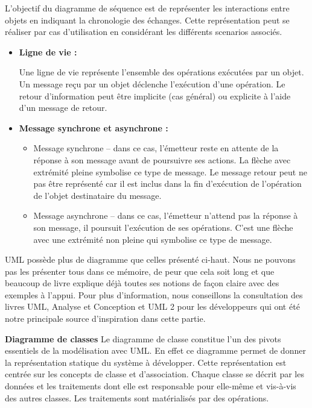 L’objectif du diagramme de séquence est de représenter les interactions entre objets en indiquant la chronologie des échanges. Cette représentation peut se réaliser par cas d’utilisation en considérant les différents scenarios associés. 
		\begin{itemize}[label=\textbullet, font=\LARGE \color{blue}] 
			\item   \textbf{Ligne de vie :} 
		
			Une ligne de vie représente l’ensemble des opérations exécutées par un objet. Un message reçu par un objet déclenche l’exécution d’une opération. Le retour d’information peut être implicite (cas général) ou explicite à l’aide d’un message de retour. 
			\item  \textbf{Message synchrone et asynchrone :} 
					\begin{itemize}[label=\textbullet, font=\LARGE \color{black}] 
						\item  Message synchrone – dans ce cas, l’émetteur reste en attente de la réponse à son message avant de poursuivre ses actions. La flèche avec extrémité pleine symbolise ce type de message. Le message retour peut ne pas être représenté car il est inclus dans la fin d’exécution de l’opération de l’objet destinataire du message.
						\item  Message asynchrone – dans ce cas, l’émetteur n’attend pas la réponse à son message, il poursuit l’exécution de ses opérations. C’est une flèche avec une extrémité non pleine qui symbolise ce type de message. 
					\end{itemize}
		\end{itemize}
		
UML possède plus de diagramme que celles présenté ci-haut. Nous ne pouvons pas les présenter tous dans ce mémoire, de peur que cela soit long et que beaucoup de livre explique déjà toutes ses notions de façon claire avec des exemples à l’appui. Pour plus d’information, nous conseillons la consultation des livres UML, Analyse et Conception et UML 2 pour les développeurs qui ont été notre principale source d’inspiration dans cette partie. 

\textbf{Diagramme de classes}
Le diagramme de classe constitue l’un des pivots essentiels de la modélisation avec UML. En effet ce diagramme permet de donner la représentation statique du système à développer. Cette représentation est centrée sur les concepts de classe et d’association. Chaque classe se décrit par les données et les traitements dont elle est responsable pour elle-même et vis-à-vis des autres classes. Les traitements sont matérialisés par des opérations.

